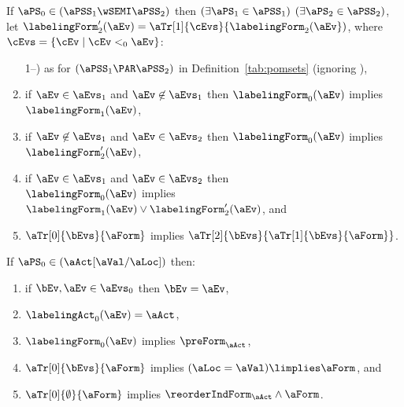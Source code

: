 \begin{definition}
  \noindent
  If $\aPS_0 \in (\aPSS_1\wSEMI\aPSS_2)$ then
  $(\exists\aPS_1\in\aPSS_1)$ $(\exists\aPS_2\in\aPSS_2)$,\\
  let $\labelingForm'_2(\aEv)=\aTr[1]{\cEvs}{\labelingForm_2(\aEv})$, where $\cEvs=\{ \cEv \mid \cEv <_0 \aEv \}$:
  \begin{enumerate}  
  \setcounter{enumi}{\value{pomsetParXount}}
  \item[1--\thepomsetParXount)] as for $(\aPSS_1\PAR\aPSS_2)$  in
    Definition~\ref{tab:pomsets} (ignoring \thepomsetParDisjointXount),
  \item if $\aEv\in\aEvs_1$ and $\aEv\not\in\aEvs_1$ then $\labelingForm_0(\aEv)$ implies $\labelingForm_1(\aEv)$,
  \item if $\aEv\not\in\aEvs_1$ and $\aEv\in\aEvs_2$ then $\labelingForm_0(\aEv)$ implies $\labelingForm'_2(\aEv)$,
  \item if $\aEv\in\aEvs_1$ and $\aEv\in\aEvs_2$ then\\ $\labelingForm_0(\aEv)$ implies $\labelingForm_1(\aEv)\lor\labelingForm'_2(\aEv)$, and
  \item $\aTr[0]{\bEvs}{\aForm}$ implies $\aTr[2]{\bEvs}{\aTr[1]{\bEvs}{\aForm}}$.
  \end{enumerate}

  \noindent
  If $\aPS_0 \in (\aAct[\aVal/\aLoc])$ then:
  \begin{enumerate}
  \item if $\bEv,\aEv\in\aEvs_0$ then $\bEv=\aEv$,
  \item $\labelingAct_0(\aEv) = \aAct$,
  \item $\labelingForm_0(\aEv)$ implies $\preForm_\aAct$,
  \item $\aTr[0]{\bEvs}{\aForm}$ implies $(\aLoc=\aVal)\limplies\aForm$, and
  \item $\aTr[0]{\emptyset}{\aForm}$ implies $\reorderIndForm_\aAct\land\aForm$.
  \end{enumerate}
\end{definition}

